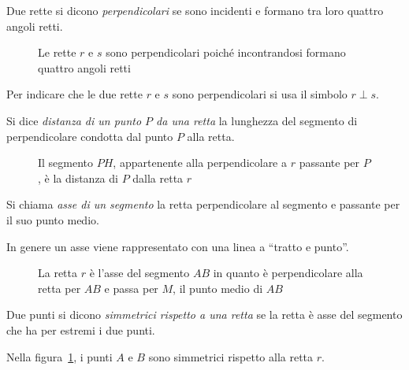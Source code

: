 \begin{definizione}
Due rette si dicono \emph{perpendicolari} se sono incidenti e formano tra loro quattro angoli retti.
\end{definizione}

\begin{figure}[htb]
\centering
\caption{Le rette $r$ e $s$ sono perpendicolari poiché incontrandosi formano quattro angoli retti}
\end{figure}

Per indicare che le due rette $r$ e $s$ sono perpendicolari si usa il simbolo $r\perp s$.

\begin{definizione}
Si dice \emph{distanza di un punto $P$ da una retta} la lunghezza del segmento di perpendicolare condotta dal punto $P$ alla retta.
\end{definizione}

\begin{figure}[htb]
\centering
\caption{Il segmento $PH$, appartenente alla perpendicolare a $r$ passante per $P$, è la distanza di $P$ dalla retta $r$}
\end{figure}

\begin{definizione}\label{def:asse_segmento}
Si chiama \emph{asse di un segmento} la retta perpendicolare al segmento e passante per il suo punto medio.
\end{definizione}

In genere un asse viene rappresentato con una linea a ``tratto e punto''.

\begin{figure}[htb]
\centering
\caption{La retta $r$ è l'asse del segmento $AB$ in quanto è perpendicolare alla retta per $AB$ e passa per $M$, il punto medio di $AB$}\label{fig:1.38}
\end{figure}

\begin{definizione}
Due punti si dicono \emph{simmetrici rispetto a una retta} se la retta è asse del segmento che ha per estremi i due punti.
\end{definizione}

Nella figura~\ref{fig:1.38}, i punti $A$ e $B$ sono simmetrici rispetto alla retta $r$.

\vspazio\ovalbox{\risolvii \ref{ese:1.66}, \ref{ese:1.67}, \ref{ese:1.68}, \ref{ese:1.69}, \ref{ese:1.70}, \ref{ese:1.71}, \ref{ese:1.72}, \ref{ese:1.73}, \ref{ese:1.74}, \ref{ese:1.75}, \ref{ese:1.76}, \ref{ese:1.77}, \ref{ese:1.78},}

